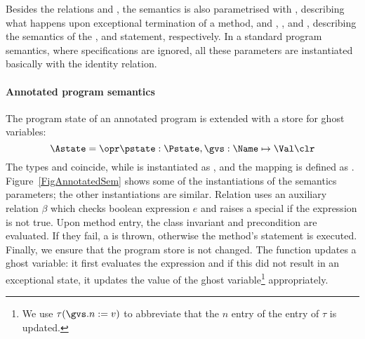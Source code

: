 Besides the relations \gammain and \gammanorm, the semantics
is also parametrised with 
\gammaexc, describing what happens upon exceptional termination of a
method, and \deltaset, \deltacase, and \deltaassert, describing the
semantics of the \Set, \CaseJML and \Assert statement,
respectively. In a standard program semantics, where specifications
are ignored, all these parameters are instantiated basically with the
identity relation. 



\paragraph{Annotated program semantics}


The program state of an annotated program is extended with a store for
ghost variables:
\[
\Astate = \opr \pstate : \Pstate, \gvs : \Name \mapsto \Val \clr
\]
The types \FullProgram and \Program coincide, while \FullState is
instantiated as \Astate, and the mapping \progstate is defined as
\pstate. Figure~\ref{FigAnnotatedSem} shows some of the 
instantiations of the semantics parameters; the other instantiations
are similar. Relation \gammain uses an auxiliary relation \(\beta\)
which checks boolean expression \(e\) and raises a special \JMLExc if
the expression is not true. Upon method entry, the class invariant and
precondition are evaluated. If they fail, a \JMLExc is thrown,
otherwise the method's \preset statement is executed. Finally, we
ensure that the program store is not changed. The function
\deltaset updates a ghost variable: it first evaluates the expression
and if this did not result in an exceptional state, it updates the
value of the ghost variable\footnote{We use \(\tau(\gvs.n := v)\) to
abbreviate that the \(n\) entry of the \gvs entry of \(\tau\) is
updated.} appropriately. 

